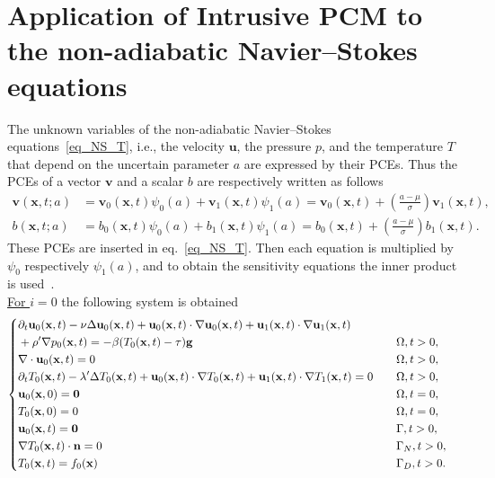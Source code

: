 \section{Application of Intrusive PCM to the non-adiabatic Navier–Stokes equations}

The unknown variables of the non-adiabatic Navier–Stokes equations~\eqref{eq_NS_T}, i.e., the velocity $\mathbf{u}$, the pressure $p$, and the temperature $T$ that depend on the uncertain parameter $a$ are expressed by their PCEs. Thus the PCEs of a vector $\mathbf{v}$ and a scalar $b$ are respectively written as follows
\begin{align*}
 \mathbf{v}(\mathbf{x},t;a)& =\mathbf{v}_0(\mathbf{x},t)\psi_0(a) +\mathbf{v}_1(\mathbf{x},t)\psi_1(a)=\mathbf{v}_0(\mathbf{x},t) + \left( \frac{a-\mu}{\sigma}\right)\mathbf{v}_1(\mathbf{x},t), \\
b(\mathbf{x},t;a) & =b_0(\mathbf{x},t)\psi_0(a) +b_1(\mathbf{x},t)\psi_1(a)
 =b_0(\mathbf{x},t) + \left( \frac{a-\mu}{\sigma}\right)b_1(\mathbf{x},t).
 \end{align*}
These PCEs are inserted in eq.~\eqref{eq_NS_T}. Then each equation is multiplied by $\psi_0$ respectively $\psi_1(a)$, and to obtain the sensitivity equations the inner product is used~\cite{nouaime2024stability, nouaime2025sensitivity}. \\

\underline{For $i=0$} the following system is obtained
\begin{equation} 
\left\lbrace
\begin{aligned}
& \partial_t \mathbf{u}_0(\mathbf{x},t)-\nu\Delta \mathbf{u}_0(\mathbf{x},t)+\mathbf{u}_0(\mathbf{x},t)\cdot\nabla \mathbf{u}_0(\mathbf{x},t)+{\mathbf u}_1(\mathbf{x},t)\cdot\nabla {\mathbf u}_1(\mathbf{x},t)\\
&+\rho'\nabla p_0(\mathbf{x},t)=-\beta(T_0(\mathbf{x},t)-\tau)\mathbf{g} && \quad \Omega,t>0,\\
& \nabla \cdot \mathbf{u}_0(\mathbf{x},t)=0 && \quad \Omega,t>0,\\
 &\partial_t T_0(\mathbf{x},t)-\lambda'\Delta T_0(\mathbf{x},t)+\mathbf{u}_0(\mathbf{x},t)\cdot\nabla T_0(\mathbf{x},t)+\mathbf{u}_1(\mathbf{x},t)\cdot\nabla T_1(\mathbf{x},t)= 0 && \quad \Omega,t>0,\\
 & \mathbf{u}_0(\mathbf{x}, 0)= \mathbf{0} && \quad \Omega,t=0,\\
 & T_0(\mathbf{x}, 0)= 0 && \quad \Omega,t=0,\\
 & \mathbf{u}_0(\mathbf{x},t)=\mathbf{0} && \quad \Gamma,t>0,\\
 & \nabla T_0(\mathbf{x},t)\cdot \mathbf{n}=0 && \quad \Gamma_N,t>0,\\
 &T_0(\mathbf{x},t)=\textcolor{black}{ f_0(\mathbf{x})} && \quad \Gamma_D,t>0.
\end{aligned}
\right.
\label{syst_NS_T_coupled_sens0}
\end{equation}

